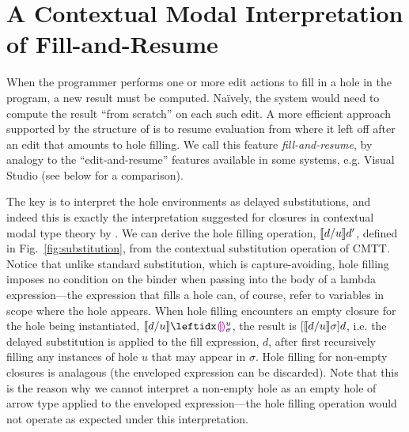 



\newcommand{\commutativitySec}{A Contextual Modal Interpretation of Fill-and-Resume}
\section{\protect\commutativitySec}
\label{sec:resumption}


When the programmer performs one or more edit actions to fill in a hole in the program, a new result must be computed. Na\"ively, the system would need to compute the result ``from scratch'' on each such edit. A more efficient approach supported by the structure of \HazelnutLive is to resume evaluation from where it left off after an edit that amounts to hole filling. We call this feature \emph{fill-and-resume}, by analogy to the ``edit-and-resume'' features available in some systems, e.g. Visual Studio (see below for a comparison).

The key is to interpret the hole environments as delayed substitutions, and indeed this is exactly the interpretation suggested for closures in contextual modal type theory by \citet{Nanevski2008}. We can derive the hole filling operation, $\llbracket d / u\rrbracket d'$, defined in Fig.~\ref{fig:substitution}, from the contextual substitution operation of CMTT. Notice that unlike standard substitution, which is capture-avoiding, hole filling imposes no condition on the binder when passing into the body of a lambda expression---the expression that fills a hole can, of course, refer to variables in scope where the hole appears. When hole filling encounters an empty closure for the hole being instantiated, $\instantiate{d}{u}{\dehole{u}{\sigma}{}}$, the result is $[\llbracket d / u\rrbracket \sigma]d$, i.e. the delayed substitution is applied to the fill expression, $d$, after first recursively filling any instances of hole $u$ that may appear in $\sigma$. Hole filling for non-empty closures is analagous (the enveloped expression can be discarded). Note that this is the reason why we cannot interpret a non-empty hole as an empty hole of arrow type applied to the enveloped expression---the hole filling operation would not operate as expected under this interpretation.

